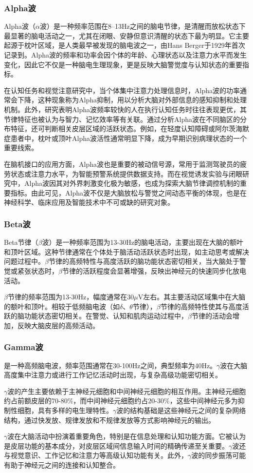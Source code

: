 \documentclass{ctexart}
\begin{document}
		\subsubsection{Alpha波}
			Alpha波（$\alpha$波）是一种频率范围在8–13Hz之间的脑电节律，是清醒而放松状态下最显著的脑电活动之一，尤其在闭眼、安静但意识清醒的状态下最为明显。它主要起源于枕叶区域，是人类最早被发现的脑电波之一，由Hans Berger于1929年首次记录到。Alpha波的频率和功率会因个体的年龄、心理状态以及注意力水平而发生变化，因此它不仅是一种脑电生理现象，更是反映大脑警觉度与认知状态的重要指标。\par
			在认知任务和视觉注意研究中，当个体集中注意力处理信息时，Alpha波的功率通常会下降，这种现象称为Alpha抑制，用以分析大脑对外部信息的感知抑制和处理机制。此外，研究表明Alpha波频率较快的人在执行认知任务时往往表现更优，其节律特征也被认为与智力、记忆效率等有关联。通过分析Alpha波在不同脑区的分布特征，还可判断相关皮层区域的活跃状态。例如，在轻度认知障碍或阿尔茨海默症患者中，枕叶或顶叶Alpha波活性通常明显下降，成为早期识别病理状态的一个重要线索。\par
			在脑机接口的应用方面，Alpha波也是重要的被动信号源，常用于监测驾驶员的疲劳状态或注意力水平，为智能预警系统提供数据支持。而在视觉诱发实验与闭眼研究中，Alpha波因其对外界刺激变化极为敏感，也成为探索大脑节律调控机制的重要指标。由此可见，Alpha波不仅是大脑放松与警觉之间动态平衡的体现，也是在神经科学、临床应用及智能技术中不可或缺的研究对象。\cite{基于深度学习的高铁驾驶员EEG警觉度检测方法研究}
		\subsubsection{Beta波}
			Beta节律（$\beta$波）是一种频率范围为13-30Hz的脑电活动，主要出现在大脑的额叶和顶叶区域‌。这种节律通常在个体处于脑活动活跃状态时出现，如主动思考或解决问题过程中‌。$\beta$节律的高频特性与高度活跃的脑功能状态密切相关，当大脑处于警觉或紧张状态时，$\beta$节律的活跃程度会显著增强，反映出神经元的快速同步化放电活动‌。\par
			$\beta$节律的频率范围为13-30Hz，幅度通常在30$\mu$V左右。其主要活动区域集中在大脑的额叶和顶叶。相较于低频脑电波（如$\delta$、$\theta$节律），$\beta$节律的高频特性使其与高度活跃的脑功能状态密切相关‌。在警觉、认知和肌肉运动过程中，$\beta$节律的活动会增加，反映大脑皮层的高频活动。
		\subsubsection{Gamma波‌}
			是一种高频脑电波，频率范围通常在30-100Hz之间，典型频率为40Hz。$\gamma$波在大脑高度集中注意力或进行工作记忆活动时出现，与复杂高级功能密切相关。‌\par
			$\gamma$波的产生主要依赖于主神经元细胞和中间神经元细胞的相互作用。主神经元细胞约占前额皮层的70-80\%，而中间神经元细胞约占20-30\%，这些中间神经元多为抑制性细胞，具有多样的电生理特性。$\gamma$波的结构基础是这些神经元之间的复杂网络结构，通过快发放、规律发放和不规律发放等方式影响神经元的输出‌。\par
			$\gamma$波在大脑活动中扮演着重要角色，特别是在信息处理和认知功能方面。它被认为是皮层功能的基本成分，对皮层区域间信息输入时间的精确传递至关重要。\cite{大脑认知过程Gamma节律模式及起源机制}$\gamma$波还与视觉意识、工作记忆和注意力等高级认知功能有关‌。此外，$\gamma$波的同步振荡可能有助于神经元之间的连接和认知整合‌。
	\newpage
\end{document}
